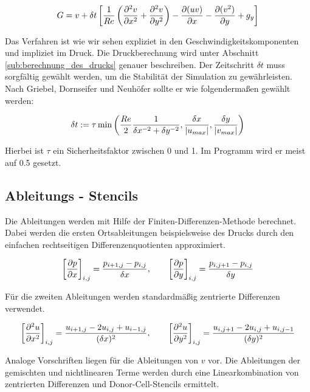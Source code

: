 		\[ G = v + \delta t \left[  \frac{1}{Re} \left(  \frac{\partial ^{2} v}{\partial x ^{2}} + \frac{\partial ^{2} v}{\partial y ^{2}} \right) 
		- \frac{ \partial (uv) }{ \partial x} - \frac{ \partial (v^{2}) }{ \partial y} + g_y  \right] \]

		Das Verfahren ist wie wir sehen expliziet in den Geschwindigkeitskomponenten und impliziet im Druck.
		Die Druckberechnung wird unter Abschnitt \ref{sub:berechnung_des_drucks} genauer beschreiben.
		Der Zeitschritt $\delta t$ muss sorgfältig gewählt werden, um die Stabilität der Simulation zu gewährleisten.
		Nach Griebel, Dornseifer und Neuhöfer sollte er wie folgendermaßen gewählt werden:

		\[ \delta t := \tau \min \left(  \frac{Re}{2} \frac{1}{\delta x^{-2} + \delta y^{-2}} , \frac{\delta x}{\left\vert u_{max} \right\vert} , 
		\frac{\delta y}{\left\vert v_{max} \right\vert}  \right) \]

		Hierbei ist $\tau$ ein Sicherheitsfaktor zwischen 0 und 1.
		Im Programm wird er meist auf 0.5 gesetzt.

	

	\subsection{Ableitungs - Stencils} %
	\label{sub:ableitungs_stencils}
	
		Die Ableitungen werden mit Hilfe der Finiten-Differenzen-Methode berechnet.
		Dabei werden die ersten Ortsableitungen beispielsweise des Drucks durch den einfachen rechtseitigen Differenzenquotienten approximiert.

		\[ \left[ \frac{\partial p}{\partial x} \right]_{i,j} = \frac{p_{i+1,j} - p_{i,j}}{\delta x}, \qquad 
		\left[ \frac{\partial p}{\partial y} \right]_{i,j} = \frac{p_{i,j+1} - p_{i,j}}{\delta y} \]

		Für die zweiten Ableitungen werden standardmäßig zentrierte Differenzen verwendet.

		\[ \left[ \frac{\partial ^2 u}{\partial x ^2} \right]_{i,j} = \frac{u_{i+1,j} - 2 u_{i,j} + u_{i-1,j}}{(\delta x) ^2}, \qquad 
		\left[ \frac{\partial ^2 u}{\partial y ^2} \right]_{i,j} = \frac{u_{i,j+1} - 2 u_{i,j} + u_{i,j-1}}{(\delta y) ^2} \]

		Analoge Vorschriften liegen für die Ableitungen von $v$ vor.
		Die Ableitungen der gemischten und nichtlinearen Terme werden durch eine Linearkombination von zentrierten Differenzen und Donor-Cell-Stencils ermittelt.

